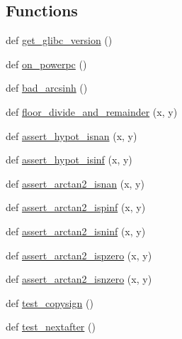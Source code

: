 \subsection*{Functions}
\begin{DoxyCompactItemize}
\item 
def \hyperlink{namespacenumpy_1_1core_1_1tests_1_1test__umath_aa2d6c363bad856fecddc53c0d46e111c}{get\+\_\+glibc\+\_\+version} ()
\item 
def \hyperlink{namespacenumpy_1_1core_1_1tests_1_1test__umath_af3ebc83287dc13baa3918fd7faae81cf}{on\+\_\+powerpc} ()
\item 
def \hyperlink{namespacenumpy_1_1core_1_1tests_1_1test__umath_a98b4cddcf4986870a7eceb8d06909571}{bad\+\_\+arcsinh} ()
\item 
def \hyperlink{namespacenumpy_1_1core_1_1tests_1_1test__umath_a22900d0c6734eafc702b1bef419ec103}{floor\+\_\+divide\+\_\+and\+\_\+remainder} (x, y)
\item 
def \hyperlink{namespacenumpy_1_1core_1_1tests_1_1test__umath_a6f0eed3639a71e82fc9d27f424de68c4}{assert\+\_\+hypot\+\_\+isnan} (x, y)
\item 
def \hyperlink{namespacenumpy_1_1core_1_1tests_1_1test__umath_a3049c014113705a548c2cfdec6af80f5}{assert\+\_\+hypot\+\_\+isinf} (x, y)
\item 
def \hyperlink{namespacenumpy_1_1core_1_1tests_1_1test__umath_aa8d77aa1591bb21acca6667dd35b8be3}{assert\+\_\+arctan2\+\_\+isnan} (x, y)
\item 
def \hyperlink{namespacenumpy_1_1core_1_1tests_1_1test__umath_a554f515345d7bb10586b3c6e67467abe}{assert\+\_\+arctan2\+\_\+ispinf} (x, y)
\item 
def \hyperlink{namespacenumpy_1_1core_1_1tests_1_1test__umath_ad2e88fe5d3bfc1163333a1abb62a344e}{assert\+\_\+arctan2\+\_\+isninf} (x, y)
\item 
def \hyperlink{namespacenumpy_1_1core_1_1tests_1_1test__umath_a7a408d0f10e8e41ee6a24853e8d34640}{assert\+\_\+arctan2\+\_\+ispzero} (x, y)
\item 
def \hyperlink{namespacenumpy_1_1core_1_1tests_1_1test__umath_a333b78eae52051787959684d2b249345}{assert\+\_\+arctan2\+\_\+isnzero} (x, y)
\item 
def \hyperlink{namespacenumpy_1_1core_1_1tests_1_1test__umath_af64274f5c308fbaf6ceb16a62e199e7b}{test\+\_\+copysign} ()
\item 
def \hyperlink{namespacenumpy_1_1core_1_1tests_1_1test__umath_affa6fee77362790749dd34a1995e9d21}{test\+\_\+nextafter} ()
\item 

\end{DoxyCompactItemize}
